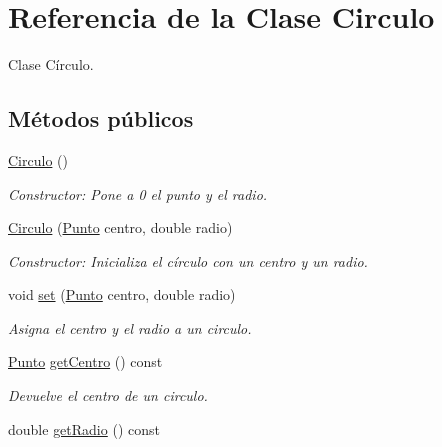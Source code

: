 \hypertarget{classCirculo}{\section{Referencia de la Clase Circulo}
\label{classCirculo}
}


Clase Círculo.  


\subsection*{Métodos públicos}
\begin{DoxyCompactItemize}
\item 
\hypertarget{classCirculo_a6933bf908b78a4167684081a3a8f257f}{\hyperlink{classCirculo_a6933bf908b78a4167684081a3a8f257f}{Circulo} ()}\label{classCirculo_a6933bf908b78a4167684081a3a8f257f}

\begin{DoxyCompactList}\small\item\em Constructor\-: Pone a 0 el punto y el radio. \end{DoxyCompactList}\item 
\hypertarget{classCirculo_ad4c6c76f0227c25afcb872a8744ebe56}{\hyperlink{classCirculo_ad4c6c76f0227c25afcb872a8744ebe56}{Circulo} (\hyperlink{classPunto}{Punto} centro, double radio)}\label{classCirculo_ad4c6c76f0227c25afcb872a8744ebe56}

\begin{DoxyCompactList}\small\item\em Constructor\-: Inicializa el círculo con un centro y un radio. \end{DoxyCompactList}\item 
\hypertarget{classCirculo_aa24cc4b316a3d9ece35f120d9b8e1fc4}{void \hyperlink{classCirculo_aa24cc4b316a3d9ece35f120d9b8e1fc4}{set} (\hyperlink{classPunto}{Punto} centro, double radio)}\label{classCirculo_aa24cc4b316a3d9ece35f120d9b8e1fc4}

\begin{DoxyCompactList}\small\item\em Asigna el centro y el radio a un circulo. \end{DoxyCompactList}\item 
\hypertarget{classCirculo_a022cde4d10d14a47a3b3921f80909f3b}{\hyperlink{classPunto}{Punto} \hyperlink{classCirculo_a022cde4d10d14a47a3b3921f80909f3b}{get\-Centro} () const }\label{classCirculo_a022cde4d10d14a47a3b3921f80909f3b}

\begin{DoxyCompactList}\small\item\em Devuelve el centro de un circulo. \end{DoxyCompactList}\item 
\hypertarget{classCirculo_a982f8a785d8a68ab1483b609cd752980}{double \hyperlink{classCirculo_a982f8a785d8a68ab1483b609cd752980}{get\-Radio} () const }\label{classCirculo_a982f8a785d8a68ab1483b609cd752980}


\end{DoxyCompactItemize}
